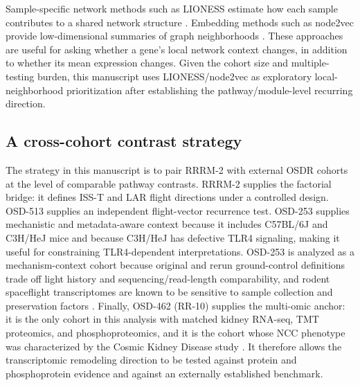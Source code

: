 \documentclass[11pt]{article}
\begin{document}
Sample-specific network methods such as LIONESS estimate how each sample contributes to a shared network structure \citep{kuijjer2019estimating}. Embedding methods such as node2vec provide low-dimensional summaries of graph neighborhoods \citep{grover2016node2vec}. These approaches are useful for asking whether a gene's local network context changes, in addition to whether its mean expression changes. Given the cohort size and multiple-testing burden, this manuscript uses LIONESS/node2vec as exploratory local-neighborhood prioritization after establishing the pathway/module-level recurring direction.

\subsection{A cross-cohort contrast strategy}

The strategy in this manuscript is to pair RRRM-2 with external OSDR cohorts at the level of comparable pathway contrasts. RRRM-2 supplies the factorial bridge: it defines ISS-T and LAR flight directions under a controlled design. OSD-513 supplies an independent flight-vector recurrence test. OSD-253 supplies mechanistic and metadata-aware context because it includes C57BL/6J and C3H/HeJ mice and because C3H/HeJ has defective TLR4 signaling, making it useful for constraining TLR4-dependent interpretations. OSD-253 is analyzed as a mechanism-context cohort because original and rerun ground-control definitions trade off light history and sequencing/read-length comparability, and rodent spaceflight transcriptomes are known to be sensitive to sample collection and preservation factors \citep{galazka2020rnaseq,preserve2016}. Finally, OSD-462 (RR-10) supplies the multi-omic anchor: it is the only cohort in this analysis with matched kidney RNA-seq, TMT proteomics, and phosphoproteomics, and it is the cohort whose NCC phenotype was characterized by the Cosmic Kidney Disease study \citep{siew2024cosmic}. It therefore allows the transcriptomic remodeling direction to be tested against protein and phosphoprotein evidence and against an externally established benchmark.
\end{document}
